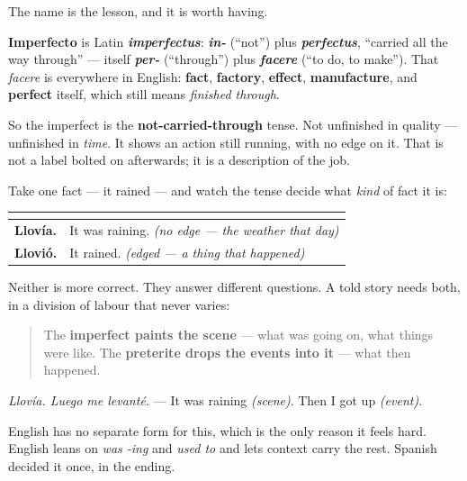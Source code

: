 \begin{cousinweb}
The name is the lesson, and it is worth having.

\textbf{Imperfecto} is Latin \emph{\textbf{imperfectus}}: \emph{\textbf{in-}} (\textquotedblleft{}not\textquotedblright{}) plus \emph{\textbf{perfectus}}, \textquotedblleft{}carried all the way through\textquotedblright{} — itself \emph{\textbf{per-}} (\textquotedblleft{}through\textquotedblright{}) plus \emph{\textbf{facere}} (\textquotedblleft{}to do, to make\textquotedblright{}). That \emph{facere} is everywhere in English: \textbf{fact}, \textbf{factory}, \textbf{effect}, \textbf{manufacture}, and \textbf{perfect} itself, which still means \emph{finished through}.

So the imperfect is the \textbf{not-carried-through} tense. Not unfinished in quality — unfinished in \emph{time}. It shows an action still running, with no edge on it. That is not a label bolted on afterwards; it is a description of the job.
\end{cousinweb}

\begin{grammarlens}[title={Grammar Lens: the scene and the events}]
Take one fact — it rained — and watch the tense decide what \emph{kind} of fact it is:

\noindent
\begin{tabularx}{\linewidth}{@{}>{\raggedright\arraybackslash}X>{\raggedright\arraybackslash}X@{}}
\toprule
\textbf{} & \textbf{} \\
\midrule
\textbf{Llovía.} & It was raining. \emph{(no edge — the weather that day)} \\
\textbf{Llovió.} & It rained. \emph{(edged — a thing that happened)} \\
\bottomrule
\end{tabularx}

Neither is more correct. They answer different questions. A told story needs both, in a division of labour that never varies:

\begin{quote}
The \textbf{imperfect paints the scene} — what was going on, what things were like. The \textbf{preterite drops the events into it} — what then happened.
\end{quote}

\emph{Llovía. Luego me levanté.} — It was raining \emph{(scene)}. Then I got up \emph{(event)}.

English has no separate form for this, which is the only reason it feels hard. English leans on \emph{was ‑ing} and \emph{used to} and lets context carry the rest. Spanish decided it once, in the ending.
\end{grammarlens}

